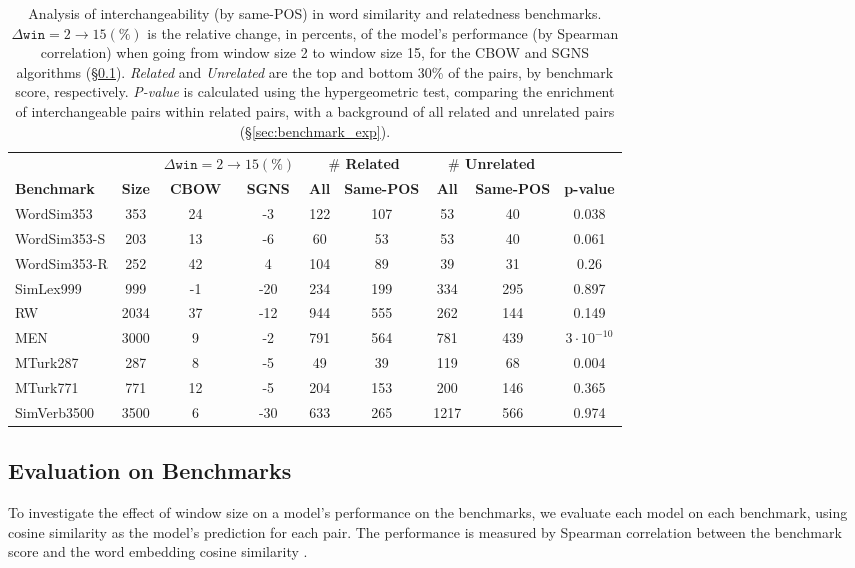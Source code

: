 \documentclass[11pt,a4paper]{article}
\begin{document}
    \begin{table}[th]
    \centering
    \begin{tabular}{@{}l|c||cc||cc|cc|c@{}}
    && \multicolumn{2}{c||}{\bf $\Delta \mathtt{win}=2\to 15 (\%)$}
    & \multicolumn{2}{c|}{\bf $\#$ Related} & \multicolumn{2}{c|}{\bf $\#$ Unrelated} \\
    \bf Benchmark & \bf Size& \bf CBOW & \bf SGNS
    & \bf All & \bf Same-POS & \bf All & \bf Same-POS & \bf p-value \\
    \hline
    WordSim353 & 353 & 24 & -3 & 122 & 107 & 53 & 40 & 0.038 \\
    WordSim353-S & 203 & 13 & -6 & 60 & 53 & 53 & 40 & 0.061 \\
    WordSim353-R & 252 & 42 & 4 & 104 & 89 & 39 & 31 & 0.26 \\
    SimLex999 & 999 & -1 & -20 & 234 & 199 & 334 & 295 & 0.897 \\
    RW & 2034 & 37 & -12 & 944 & 555 & 262 & 144 & 0.149 \\
    MEN & 3000 & 9 & -2 & 791 & 564 & 781 & 439 & $3\cdot10^{-10}$ \\
    MTurk287 & 287 & 8 & -5 & 49 & 39 & 119 & 68 & 0.004 \\
    MTurk771 & 771 & 12 & -5 & 204 & 153 & 200 & 146 & 0.365 \\
    SimVerb3500 & 3500 & 6 & -30 & 633 & 265 & 1217 & 566 & 0.974
    \end{tabular}
    \caption{Analysis of interchangeability (by same-POS) in
    word similarity and relatedness benchmarks.
    $\Delta \mathtt{win}=2\to 15 (\%)$ is the relative change, in percents,
    of the model's performance (by Spearman correlation) when going from window size 2
    to window size 15, for the CBOW
    and SGNS algorithms (\S\ref{sec:eval_exp}).
    \textit{Related} and \textit{Unrelated} are the top and bottom 30\% of the pairs,
    by benchmark score, respectively.
    \textit{P-value} is calculated using the hypergeometric
    test, comparing the enrichment of interchangeable pairs within related pairs,
    with a background of all related and unrelated pairs (\S\ref{sec:benchmark_exp}).\label{tab:benchmark_enrichment}}
    \end{table}
    
    \subsection{Evaluation on Benchmarks}\label{sec:eval_exp}
    
    To investigate the effect of window size on a model's performance on the benchmarks,
    we evaluate each model on each benchmark, using cosine similarity
    as the model's prediction for each pair.
    The performance is measured by Spearman correlation between the benchmark score
    and the word embedding cosine similarity \cite{levy2015improving}.
    
\end{document}

